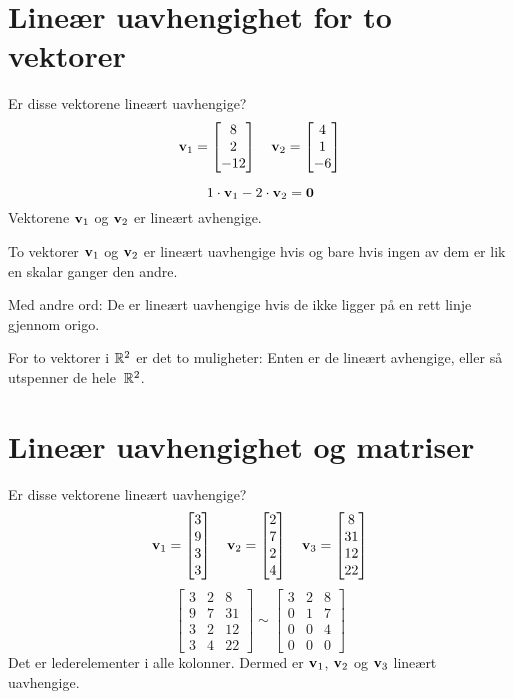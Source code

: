 \begin{ex}
\end{ex}


\section*{Lineær uavhengighet for to vektorer}

\begin{ex}
Er disse vektorene lineært uavhengige?
\[
\mathbf{v}_1 = \begin{bmatrix} 8 \\ 2 \\ -12 \end{bmatrix}\quad
\mathbf{v}_2 = \begin{bmatrix} 4 \\ 1 \\ -6 \end{bmatrix}
\]

\[
1 \cdot \mathbf{v}_1 - 2 \cdot \mathbf{v}_2 = \mathbf{0}
\]
Vektorene $\mathbf{v}_1$ og $\mathbf{v}_2$ er lineært avhengige.
\end{ex}

\begin{thm}
To vektorer $\mathbf{v}_1$ og $\mathbf{v}_2$ er lineært uavhengige hvis og bare
hvis ingen av dem er lik en skalar ganger den andre.
\end{thm}

Med andre ord: De er lineært uavhengige hvis de ikke ligger på en rett
linje gjennom origo.

For to vektorer i $\mathbb{R}^2$ er det to muligheter: Enten er de lineært
avhengige, eller så utspenner de hele~$\mathbb{R}^2$.





\section*{Lineær uavhengighet og matriser}

\begin{ex}
Er disse vektorene lineært uavhengige?
\[
\mathbf{v}_1 = \begin{bmatrix} 3 \\ 9 \\ 3 \\ 3 \end{bmatrix}\quad
\mathbf{v}_2 = \begin{bmatrix} 2 \\ 7 \\ 2 \\ 4 \end{bmatrix}\quad
\mathbf{v}_3 = \begin{bmatrix} 8 \\ 31 \\ 12 \\ 22 \end{bmatrix}
\]
\[
\begin{bmatrix}
3 & 2 & 8 \\
9 & 7 & 31 \\
3 & 2 & 12 \\
3 & 4 & 22
\end{bmatrix}
\sim
\begin{bmatrix}
3 & 2 & 8 \\
0 & 1 & 7 \\
0 & 0 & 4 \\
0 & 0 & 0
\end{bmatrix}
\]
Det er lederelementer i alle kolonner.  Dermed er $\mathbf{v}_1$,
$\mathbf{v}_2$ og $\mathbf{v}_3$ lineært uavhengige.
\end{ex}


